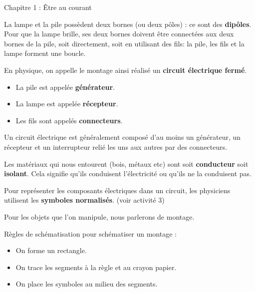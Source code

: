 \documentclass[24pt]{article}
\newcommand{\titre}{Chapitre 1 : Être au courant} %
\begin{document}
\thispagestyle{fancy}
\cfoot{}

\begin{titlebox}{\titre}
    \setlength\parindent{4pt} %
    \setlength\parskip{5pt} 

    La lampe et la pile possèdent deux bornes (ou deux pôles) : ce sont des \textbf{\color{DarkRed} {dipôles}}. Pour que la lampe brille, ses deux
    bornes doivent être connectées aux deux bornes de la pile, soit directement, soit en utilisant des fils: la pile, les fils et
    la lampe forment une boucle. 
    
    En physique, on appelle le montage ainsi réalisé un \textbf{\color{DarkRed} {circuit électrique fermé}}.

    \begin{itemize}
        \item La pile est appelée \textbf{\color{DarkRed} {générateur}}.
        \item La lampe est appelée \textbf{\color{DarkRed} {récepteur}}.
        \item Les fils sont appelés \textbf{\color{DarkRed} {connecteurs}}.
    \end{itemize}

    Un circuit électrique est généralement composé d’au moins un
    générateur, un récepteur et un interrupteur relié les uns
    aux autres par des connecteurs.
    
    \vspace{50pt}

    Les matériaux qui nous entourent (bois, métaux etc) sont soit \textbf{\color{DarkRed} {conducteur}} soit \textbf{\color{DarkRed} {isolant}}.
    Cela signifie qu'ils conduisent l'électricité ou qu'ils ne la conduisent pas.

    \vspace{50pt}

    Pour représenter les composants électriques dans un circuit, 
    les physiciens utilisent les \textbf{\color{DarkRed} {symboles normalisés}}. (voir activité 3)
    
    Pour les objets que l’on manipule, nous parlerons de montage.
    
    \begin{mybox}
        Règles de schématisation pour schématiser un montage :
        \begin{itemize}
            \item On forme un rectangle.
            \item On trace les segments à la règle et au crayon papier.
            \item On place les symboles au milieu des segments.    

        \end{itemize}    
    \end{mybox}

\end{titlebox}
\end{document}
